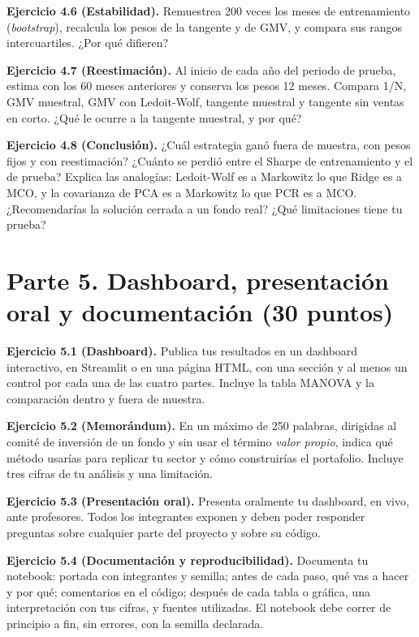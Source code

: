 \documentclass[11pt,letterpaper]{article}
\newcommand{\ejercicio}[1]{\par\medskip\textbf{Ejercicio #1.}\space}
\begin{document}
\ejercicio{4.6 (Estabilidad)} Remuestrea 200 veces los meses de entrenamiento (\emph{bootstrap}), recalcula los pesos de la tangente y de GMV, y compara sus rangos intercuartiles. ¿Por qué difieren?

\ejercicio{4.7 (Reestimación)} Al inicio de cada año del periodo de prueba, estima con los 60 meses anteriores y conserva los pesos 12 meses. Compara 1/N, GMV muestral, GMV con Ledoit-Wolf, tangente muestral y tangente sin ventas en corto. ¿Qué le ocurre a la tangente muestral, y por qué?

\ejercicio{4.8 (Conclusión)} ¿Cuál estrategia ganó fuera de muestra, con pesos fijos y con reestimación? ¿Cuánto se perdió entre el Sharpe de entrenamiento y el de prueba? Explica las analogías: Ledoit-Wolf es a Markowitz lo que Ridge es a MCO, y la covarianza de PCA es a Markowitz lo que PCR es a MCO. ¿Recomendarías la solución cerrada a un fondo real? ¿Qué limitaciones tiene tu prueba?

\section*{Parte 5. Dashboard, presentación oral y documentación (30 puntos)}

\ejercicio{5.1 (Dashboard)} Publica tus resultados en un dashboard interactivo, en Streamlit o en una página HTML, con una sección y al menos un control por cada una de las cuatro partes. Incluye la tabla MANOVA y la comparación dentro y fuera de muestra.

\ejercicio{5.2 (Memorándum)} En un máximo de 250 palabras, dirigidas al comité de inversión de un fondo y sin usar el término \emph{valor propio}, indica qué método usarías para replicar tu sector y cómo construirías el portafolio. Incluye tres cifras de tu análisis y una limitación.

\ejercicio{5.3 (Presentación oral)} Presenta oralmente tu dashboard, en vivo, ante profesores. Todos los integrantes exponen y deben poder responder preguntas sobre cualquier parte del proyecto y sobre su código.

\ejercicio{5.4 (Documentación y reproducibilidad)} Documenta tu notebook: portada con integrantes y semilla; antes de cada paso, qué vas a hacer y por qué; comentarios en el código; después de cada tabla o gráfica, una interpretación con tus cifras, y fuentes utilizadas. El notebook debe correr de principio a fin, sin errores, con la semilla declarada.
\end{document}
